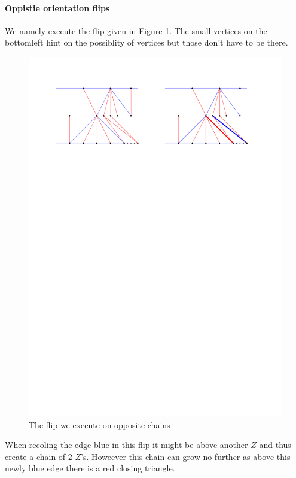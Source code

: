 

 \paragraph{Oppistie orientation flips}
 We namely execute the flip given in Figure \ref{fig:uni:oppFlip}. The small vertices on the bottomleft hint on the possiblity of vertices but those don't have to be there.

\begin{figure}[h]
  \centering
  \includegraphics[width = \textwidth]{unifiedAlgo/img/post/oppFlip}
  \caption{The flip we execute on opposite chains}
  \label{fig:uni:oppFlip}
\end{figure}

When recoling the edge blue in this flip it might be above another $Z$ and thus create a chain of $2$ $Z$'s. Howeever this chain can grow no further as above this newly blue edge there is a red closing triangle.

